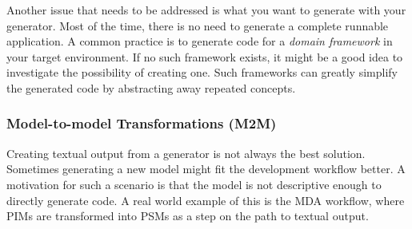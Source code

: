 Another issue that needs to be addressed is what you want to generate with your generator. Most of the time, there is no need to generate a complete runnable application. A common practice is to generate code for a \emph{domain framework} in your target environment. If no such framework exists, it might be a good idea to investigate the possibility of creating one. Such frameworks can greatly simplify the generated code by abstracting away repeated concepts.

\subsubsection{Model-to-model Transformations (M2M)}
Creating textual output from a generator is not always the best solution. Sometimes generating a new model might fit the development workflow better. A motivation for such a scenario is that the model is not descriptive enough to directly generate code. A real world example of this is the MDA workflow, where PIMs are transformed into PSMs as a step on the path to textual output.

